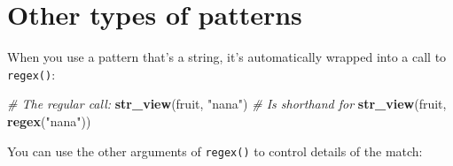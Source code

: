 \documentclass[]{book}
\newenvironment{Shaded}{\begin{snugshade}}{\end{snugshade}}
\newcommand{\CommentTok}[1]{\textcolor[rgb]{0.56,0.35,0.01}{\textit{#1}}}
\newcommand{\KeywordTok}[1]{\textcolor[rgb]{0.13,0.29,0.53}{\textbf{#1}}}
\newcommand{\NormalTok}[1]{#1}
\newcommand{\StringTok}[1]{\textcolor[rgb]{0.31,0.60,0.02}{#1}}
\begin{document}
\hypertarget{other-types-of-patterns}{%
\section{Other types of patterns}\label{other-types-of-patterns}}

When you use a pattern that's a string, it's automatically wrapped into a call to \texttt{regex()}:

\begin{Shaded}
\begin{Highlighting}[]
\CommentTok{# The regular call:}
\KeywordTok{str_view}\NormalTok{(fruit, }\StringTok{"nana"}\NormalTok{)}
\CommentTok{# Is shorthand for}
\KeywordTok{str_view}\NormalTok{(fruit, }\KeywordTok{regex}\NormalTok{(}\StringTok{"nana"}\NormalTok{))}
\end{Highlighting}
\end{Shaded}

You can use the other arguments of \texttt{regex()} to control details of the match:
\end{document}
